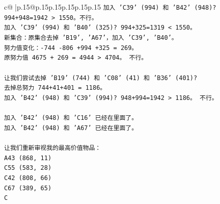 \documentclass{article}
\begin{document}
{\begin{supertabular}{c@{$\;$}|p{.15\linewidth}@{}p{.15\linewidth}p{.15\linewidth}p{.15\linewidth}p{.15\linewidth}p{.15\linewidth}}
{{{\texttt{加入 'C39' (994) 和 'B42' (948)? 994+948=1942 > 1550。不行。} \\
\texttt{加入 'C39' (994) 和 'B40' (325)? 994+325=1319 < 1550。} \\
\texttt{新集合：原集合去掉 'B19', 'A67'，加入 'C39', 'B40'。} \\
\texttt{努力值变化：{-}744 {-}806 +994 +325 = 269。} \\
\texttt{原努力值 4675 + 269 = 4944 > 4704。 不行。} \\
\\ 
\texttt{让我们尝试去掉 'B19' (744) 和 'C08' (41) 和 'B36' (401)?} \\
\texttt{去掉总努力 744+41+401 = 1186。} \\
\texttt{加入 'B42' (948) 和 'C39' (994)? 948+994=1942 > 1186。 不行。} \\
\\ 
\texttt{加入 'B42' (948) 和 'C16' 已经在里面了。} \\
\texttt{加入 'B42' (948) 和 'A67' 已经在里面了。} \\
\\ 
\texttt{让我们重新审视我的最高价值物品：} \\
\texttt{A43 (868, 11)} \\
\texttt{C55 (583, 28)} \\
\texttt{C42 (808, 66)} \\
\texttt{C67 (389, 65)} \\
\texttt{C} \\
            }
        }
    }
     \\ \\


\end{supertabular}}
\end{document}

